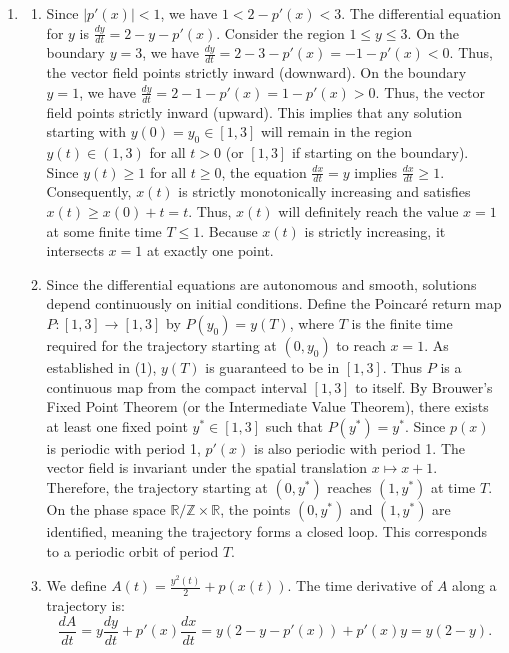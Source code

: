 \documentclass{article}
\begin{document}
\begin{enumerate}[label=\fbox{\arabic*}]
  \item %
        \begin{enumerate}[label=(\arabic*)]
          \item Since $|p'(x)| < 1$, we have $1 < 2 - p'(x) < 3$. 
          The differential equation for $y$ is $\frac{dy}{dt} = 2 - y - p'(x)$. 
          Consider the region $1 \le y \le 3$. On the boundary $y=3$, we have $\frac{dy}{dt} = 2 - 3 - p'(x) = -1 - p'(x) < 0$. Thus, the vector field points strictly inward (downward).
          On the boundary $y=1$, we have $\frac{dy}{dt} = 2 - 1 - p'(x) = 1 - p'(x) > 0$. Thus, the vector field points strictly inward (upward).
          This implies that any solution starting with $y(0) = y_0 \in [1, 3]$ will remain in the region $y(t) \in (1, 3)$ for all $t > 0$ (or $[1, 3]$ if starting on the boundary).
          Since $y(t) \ge 1$ for all $t \ge 0$, the equation $\frac{dx}{dt} = y$ implies $\frac{dx}{dt} \ge 1$. 
          Consequently, $x(t)$ is strictly monotonically increasing and satisfies $x(t) \ge x(0) + t = t$. 
          Thus, $x(t)$ will definitely reach the value $x=1$ at some finite time $T \le 1$. Because $x(t)$ is strictly increasing, it intersects $x=1$ at exactly one point.
          \item Since the differential equations are autonomous and smooth, solutions depend continuously on initial conditions. 
          Define the Poincaré return map $P: [1, 3] \to [1, 3]$ by $P(y_0) = y(T)$, where $T$ is the finite time required for the trajectory starting at $(0, y_0)$ to reach $x=1$. 
          As established in (1), $y(T)$ is guaranteed to be in $[1, 3]$. Thus $P$ is a continuous map from the compact interval $[1, 3]$ to itself.
          By Brouwer's Fixed Point Theorem (or the Intermediate Value Theorem), there exists at least one fixed point $y^* \in [1, 3]$ such that $P(y^*) = y^*$.
          Since $p(x)$ is periodic with period 1, $p'(x)$ is also periodic with period 1. The vector field is invariant under the spatial translation $x \mapsto x+1$.
          Therefore, the trajectory starting at $(0, y^*)$ reaches $(1, y^*)$ at time $T$. On the phase space $\mathbb{R}/\mathbb{Z} \times \mathbb{R}$, the points $(0, y^*)$ and $(1, y^*)$ are identified, meaning the trajectory forms a closed loop. This corresponds to a periodic orbit of period $T$.
          \item We define $A(t) = \frac{y^2(t)}{2} + p(x(t))$. The time derivative of $A$ along a trajectory is:
          \[
            \frac{dA}{dt} = y \frac{dy}{dt} + p'(x) \frac{dx}{dt} = y (2 - y - p'(x)) + p'(x) y = y(2 - y).
\]
\end{enumerate}
\end{enumerate}
\end{document}
